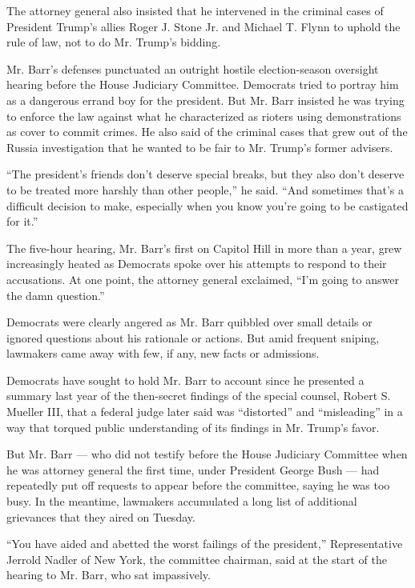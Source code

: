 The attorney general also insisted that he intervened in the criminal
cases of President Trump's allies Roger J. Stone Jr. and Michael T.
Flynn to uphold the rule of law, not to do Mr. Trump's bidding.

Mr. Barr's defenses punctuated an outright hostile election-season
oversight hearing before the House Judiciary Committee. Democrats tried
to portray him as a dangerous errand boy for the president. But Mr. Barr
insisted he was trying to enforce the law against what he characterized
as rioters using demonstrations as cover to commit crimes. He also said
of the criminal cases that grew out of the Russia investigation that he
wanted to be fair to Mr. Trump's former advisers.

``The president's friends don't deserve special breaks, but they also
don't deserve to be treated more harshly than other people,'' he said.
``And sometimes that's a difficult decision to make, especially when you
know you're going to be castigated for it.''

The five-hour hearing, Mr. Barr's first on Capitol Hill in more than a
year, grew increasingly heated as Democrats spoke over his attempts to
respond to their accusations. At one point, the attorney general
exclaimed, ``I'm going to answer the damn question.''

Democrats were clearly angered as Mr. Barr quibbled over small details
or ignored questions about his rationale or actions. But amid frequent
sniping, lawmakers came away with few, if any, new facts or admissions.

Democrats have sought to hold Mr. Barr to account since he presented a
summary last year of the then-secret findings of the special counsel,
Robert S. Mueller III, that a federal judge later said was ``distorted''
and ``misleading'' in a way that torqued public understanding of its
findings in Mr. Trump's favor.

But Mr. Barr --- who did not testify before the House Judiciary
Committee when he was attorney general the first time, under President
George Bush --- had repeatedly put off requests to appear before the
committee, saying he was too busy. In the meantime, lawmakers
accumulated a long list of additional grievances that they aired on
Tuesday.

``You have aided and abetted the worst failings of the president,''
Representative Jerrold Nadler of New York, the committee chairman, said
at the start of the hearing to Mr. Barr, who sat impassively.

